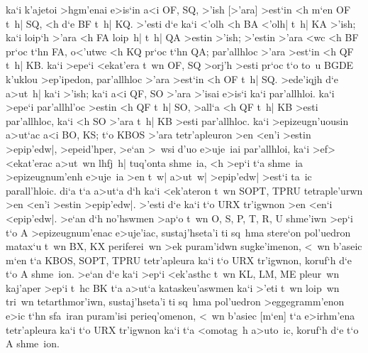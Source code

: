 \begin{Parallel}{}{}
{{ka`i k'ajetoi >hgm'enai e>is`in a<i OF, SQ, >'ish [>'ara] >est`in <h m`en OF t~h| SQ, <h d`e BF
t~h| KQ. >'esti d`e ka`i <'olh <h BA <'olh| t~h| KA >'ish; ka`i loip`h >'ara <h FA loip~h| t~h| QA >estin
>'ish; >'estin >'ara <wc <h BF pr`oc t`hn FA, o<'utwc <h KQ pr`oc t`hn QA; par'allhloc >'ara >est`in <h QF t~h| KB. ka`i
>epe`i <ekat'era t~wn OF, SQ >orj'h >esti pr`oc t`o to~u BGDE k'uklou >ep'ipedon, par'allhloc >'ara >est`in <h OF t~h| SQ. >ede'iqjh
d`e a>ut~h| ka`i >'ish; ka`i a<i QF, SO >'ara >'isai e>is`i ka`i par'allhloi. ka`i >epe`i par'allhl'oc >estin <h QF t~h|
SO, >all`a <h QF t~h| KB >esti par'allhloc, ka`i <h SO >'ara t~h| KB >esti par'allhloc. ka`i >epizeugn'uousin
a>ut`ac a<i BO, KS; t`o KBOS >'ara tetr'apleuron >en <en'i >estin >epip'edw|, >epeid'hper, >e`an >~wsi d'uo
e>uje~iai par'allhloi, ka`i >ef> <ekat'erac a>ut~wn lhfj~h| tuq'onta shme~ia, <h >ep`i t`a shme~ia >epizeugnum'enh
e>uje~ia >en t~w| a>ut~w| >epip'edw| >est`i ta~ic parall'hloic. di`a t`a a>ut`a d`h ka`i <ek'ateron t~wn SOPT, TPRU
tetraple'urwn >en <en'i >estin >epip'edw|. >'esti d`e ka`i t`o URX tr'igwnon >en <en`i <epip'edw|.
>e`an d`h no'hswmen >ap`o t~wn O, S, P, T, R, U shme'iwn >ep`i t`o A
>epizeugnum'enac e>uje'iac, sustaj'hseta'i ti sq~hma stere`on pol'uedron matax`u t~wn BX, KX periferei~wn >ek puram'idwn
sugke'imenon, <~wn b'aseic m`en t`a KBOS, SOPT, TPRU tetr'apleura ka`i t`o URX tr'igwnon, koruf`h d`e t`o A shme~ion. >e`an
d`e ka`i >ep`i <ek'asthc t~wn KL, LM, ME pleur~wn kaj'aper >ep`i t~hc BK t`a a>ut`a kataskeu'aswmen ka`i
>'eti t~wn loip~wn tri~wn tetarthmor'iwn, sustaj'hseta'i ti sq~hma pol'uedron >eggegramm'enon e>ic t`hn sfa~iran
puram'isi perieq'omenon, <~wn b'asiec [m`en] t`a e>irhm'ena tetr'apleura ka`i t`o URX tr'igwnon ka`i t`a <omotag~h
a>uto~ic, koruf`h d`e t`o A shme~ion.}



}
\end{Parallel}
